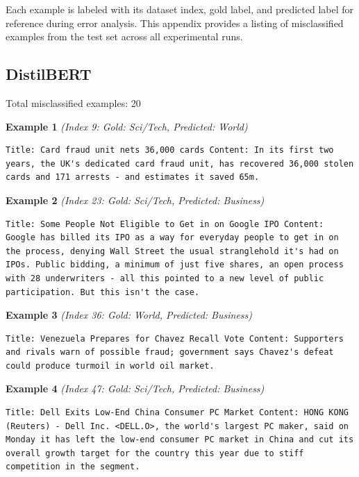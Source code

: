 Each example is labeled with its dataset index, gold label, and predicted label for reference during error analysis.
This appendix provides a listing of misclassified examples from the test set across all experimental runs.

\subsection{DistilBERT}
\label{app:distilbert}

Total misclassified examples: 20

\noindent
\textbf{Example 1} \quad \textit{(Index 9: Gold: Sci/Tech, Predicted: World)}

\begin{Verbatim}[breaklines=true,breakanywhere=true,fontsize=\small]
Title: Card fraud unit nets 36,000 cards Content: In its first two years, the UK's dedicated card fraud unit, has recovered 36,000 stolen cards and 171 arrests - and estimates it saved 65m.
\end{Verbatim}

\noindent
\textbf{Example 2} \quad \textit{(Index 23: Gold: Sci/Tech, Predicted: Business)}

\begin{Verbatim}[breaklines=true,breakanywhere=true,fontsize=\small]
Title: Some People Not Eligible to Get in on Google IPO Content: Google has billed its IPO as a way for everyday people to get in on the process, denying Wall Street the usual stranglehold it's had on IPOs. Public bidding, a minimum of just five shares, an open process with 28 underwriters - all this pointed to a new level of public participation. But this isn't the case.
\end{Verbatim}

\noindent
\textbf{Example 3} \quad \textit{(Index 36: Gold: World, Predicted: Business)}

\begin{Verbatim}[breaklines=true,breakanywhere=true,fontsize=\small]
Title: Venezuela Prepares for Chavez Recall Vote Content: Supporters and rivals warn of possible fraud; government says Chavez's defeat could produce turmoil in world oil market.
\end{Verbatim}

\noindent
\textbf{Example 4} \quad \textit{(Index 47: Gold: Sci/Tech, Predicted: Business)}

\begin{Verbatim}[breaklines=true,breakanywhere=true,fontsize=\small]
Title: Dell Exits Low-End China Consumer PC Market Content: HONG KONG (Reuters) - Dell Inc. <DELL.O>, the world's largest PC maker, said on Monday it has left the low-end consumer PC market in China and cut its overall growth target for the country this year due to stiff competition in the segment.
\end{Verbatim}

